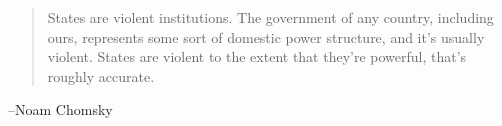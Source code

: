 \documentclass{exam}
\begin{document}
  \else
    \vspace{6 cm}
    \begin{quote}
      \begin{em}
        States are violent institutions. The government of any country, including ours, represents some sort of domestic
        power structure, and it's usually violent. States are violent to the extent that they're powerful, that's
        roughly accurate.


      \end{em}
    \end{quote}
    \hspace{1 cm} --Noam Chomsky 
  \fi
\end{document}
